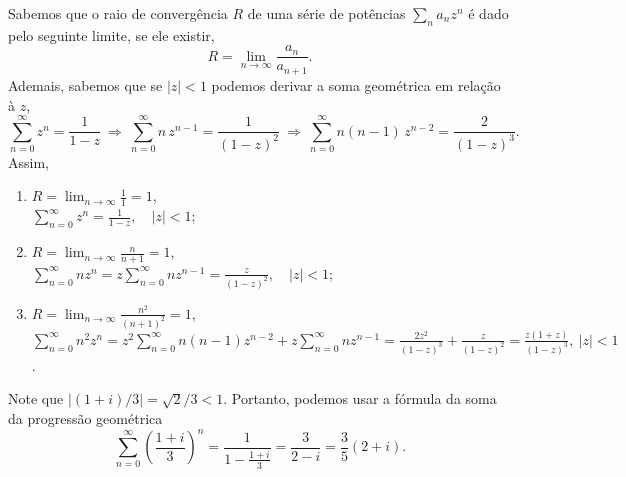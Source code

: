 \begin{questions}
%
\begin{solution}
    Sabemos que o raio de convergência $R$ de uma série de potências $\sum_n a_n z^n$ é dado pelo seguinte limite, se ele existir,
    \[R = \lim_{n\to\infty} \frac{a_{n}}{a_{n+1}}.\]
    Ademais, sabemos que se $|z|<1$ podemos derivar a soma geométrica em relação à $z$,
    \[\sum_{n=0}^\infty z^n = \frac{1}{1-z} 
        ~\Rightarrow~ \sum_{n=0}^\infty n\,z^{n-1} = \frac{1}{(1-z)^2} 
        ~\Rightarrow~ \sum_{n=0}^\infty n(n-1)\,z^{n-2} = \frac{2}{(1-z)^3}.\]
    Assim,
    \begin{enumerate}[label=(\alph*)]
      \item $\displaystyle R = \lim_{n\to\infty} \frac{1}{1} = 1$,\\ $\displaystyle \sum_{n = 0}^\infty z^n = \frac{1}{1-z}, \quad |z|<1$;
      \item $\displaystyle R = \lim_{n\to\infty} \frac{n}{n+1} = 1$,\\ $\displaystyle \sum_{n = 0}^\infty n z^n = z \sum_{n = 0}^\infty n z^{n-1} = \frac{z}{(1-z)^2}, \quad |z|<1$;
      \item $\displaystyle R = \lim_{n\to\infty} \frac{n^2}{(n+1)^2} = 1$,\\ $\displaystyle \sum_{n = 0}^\infty n^2 z^n = z^2\sum_{n = 0}^\infty n(n-1) z^{n-2} + z \sum_{n = 0}^\infty n z^{n-1}  =  \frac{2z^2}{(1-z)^3} + \frac{z}{(1-z)^2} = \frac{z(1+z)}{(1-z)^3}, ~ |z|<1$.
   \end{enumerate}
\end{solution}

%
\begin{solution}
    Note que $|(1+i)/3| = \sqrt{2}/3 < 1$. Portanto, podemos usar a fórmula da soma da progressão geométrica
    \[
        \sum_{n = 0}^\infty \left(\frac{1 + i}{3}\right)^n = \frac{1}{1 - \frac{1 + i}{3}} = \frac{3}{2-i} = \frac{3}{5}(2+i).
    \]
\end{solution}


\end{questions}
